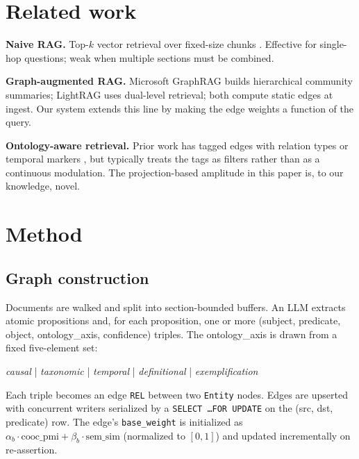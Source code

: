 \documentclass{article}
\begin{document}
\section{Related work}
\label{sec:related}

\textbf{Naive RAG.} Top-$k$ vector retrieval over fixed-size chunks
\citep{retrieval-augmented,dense-passage}. Effective for single-hop
questions; weak when multiple sections must be combined.

\textbf{Graph-augmented RAG.} Microsoft GraphRAG \citep{graphrag} builds
hierarchical community summaries; LightRAG \citep{lightrag} uses
dual-level retrieval; both compute static edges at ingest. Our system
extends this line by making the edge weights a function of the query.

\textbf{Ontology-aware retrieval.} Prior work has tagged edges with
relation types or temporal markers \citep{ontology-rag}, but typically
treats the tags as filters rather than as a continuous modulation. The
projection-based amplitude in this paper is, to our knowledge, novel.

\section{Method}
\label{sec:method}

\subsection{Graph construction}
\label{sec:method-construction}

Documents are walked and split into section-bounded buffers. An LLM
extracts atomic propositions and, for each proposition, one or more
(subject, predicate, object, ontology\_axis, confidence) triples. The
ontology\_axis is drawn from a fixed five-element set:

\begin{center}
\textit{causal} | \textit{taxonomic} | \textit{temporal} |
\textit{definitional} | \textit{exemplification}
\end{center}

Each triple becomes an edge \texttt{REL} between two \texttt{Entity}
nodes. Edges are upserted with concurrent writers serialized by a
\texttt{SELECT \dots FOR UPDATE} on the (src, dst, predicate) row. The
edge's \texttt{base\_weight} is initialized as
$\alpha_b \cdot \mathrm{cooc\_pmi} + \beta_b \cdot \mathrm{sem\_sim}$
(normalized to $[0, 1]$) and updated incrementally on re-assertion.
\end{document}
